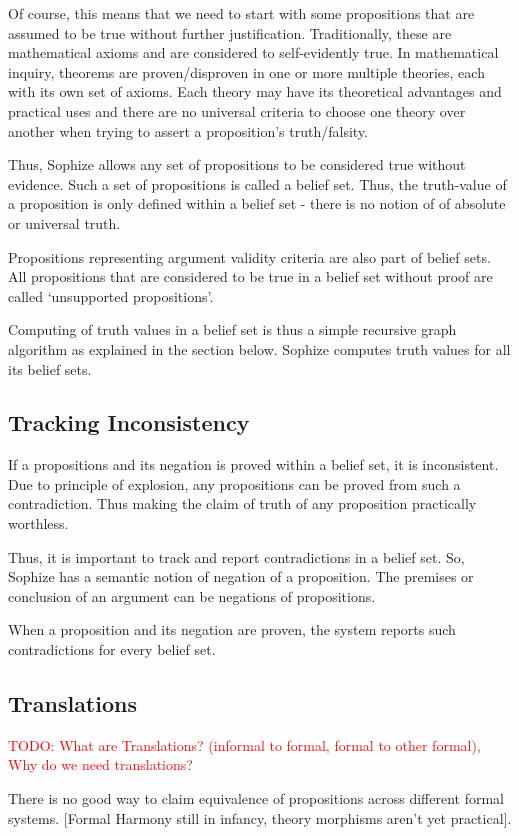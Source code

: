 \documentclass[a4paper]{article}
\newcommand\todo[1]{\textcolor{red}{TODO: #1}}
\begin{document}
Of course, this means that we need to start with some propositions that are assumed to be true without further justification. Traditionally, these are mathematical axioms and are considered to self-evidently true. In mathematical inquiry, theorems are proven/disproven in one or more multiple theories, each with its own set of axioms. Each theory may have its theoretical advantages and practical uses and there are no universal criteria to choose one theory over another when trying to assert a proposition's truth/falsity.

Thus, Sophize allows any set of propositions to be considered true without evidence. Such a set of propositions is called a belief set. Thus, the truth-value of a proposition is only defined within a belief set - there is no notion of of absolute or universal truth. 

Propositions representing argument validity criteria are also part of belief sets. All propositions that are considered to be true in a belief set without proof are called `unsupported propositions'.

Computing of truth values in a belief set is thus a simple recursive graph algorithm as explained in the section below. Sophize computes truth values for all its belief sets.

\subsection{Tracking Inconsistency}
If a propositions and its negation is proved within a belief set, it is inconsistent. Due to principle of explosion, any propositions can be proved from such a contradiction. Thus making the claim of truth of any proposition practically worthless.

Thus, it is important to track and report contradictions in a belief set. So, Sophize has a semantic notion of negation of a proposition. The premises or conclusion of an argument can be negations of propositions.

When a proposition and its negation are proven, the system reports such contradictions for every belief set.

\subsection{Translations}
\todo{What are Translations? (informal to formal, formal to other formal), Why do we need translations?}

There is no good way to claim equivalence of propositions across different formal systems. [Formal Harmony still in infancy, theory morphisms aren't yet practical].
\end{document}
